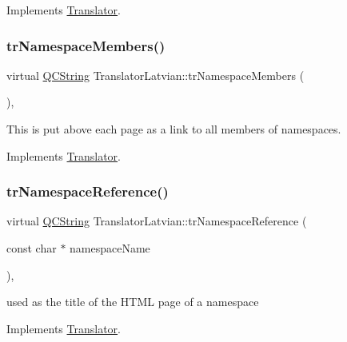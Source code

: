 Implements \mbox{\hyperlink{class_translator}{Translator}}.

\mbox{\label{class_translator_latvian_a7b0ddfd60b5a949f7d80b6643976fdcd}} 
\subsubsection{\texorpdfstring{trNamespaceMembers()}{trNamespaceMembers()}}
{\footnotesize\ttfamily virtual \mbox{\hyperlink{class_q_c_string}{Q\+C\+String}} Translator\+Latvian\+::tr\+Namespace\+Members (\begin{DoxyParamCaption}{ }\end{DoxyParamCaption})\hspace{0.3cm}{\ttfamily [inline]}, {\ttfamily [virtual]}}

This is put above each page as a link to all members of namespaces. 

Implements \mbox{\hyperlink{class_translator}{Translator}}.

\mbox{\label{class_translator_latvian_a57919caca38142c74908d6ddf6122196}} 
\subsubsection{\texorpdfstring{trNamespaceReference()}{trNamespaceReference()}}
{\footnotesize\ttfamily virtual \mbox{\hyperlink{class_q_c_string}{Q\+C\+String}} Translator\+Latvian\+::tr\+Namespace\+Reference (\begin{DoxyParamCaption}\item[{const char $\ast$}]{namespace\+Name }\end{DoxyParamCaption})\hspace{0.3cm}{\ttfamily [inline]}, {\ttfamily [virtual]}}

used as the title of the H\+T\+ML page of a namespace 

Implements \mbox{\hyperlink{class_translator}{Translator}}.

\mbox{\label{class_translator_latvian_ada12163c7bf5c1cea263e706916de578}} 
